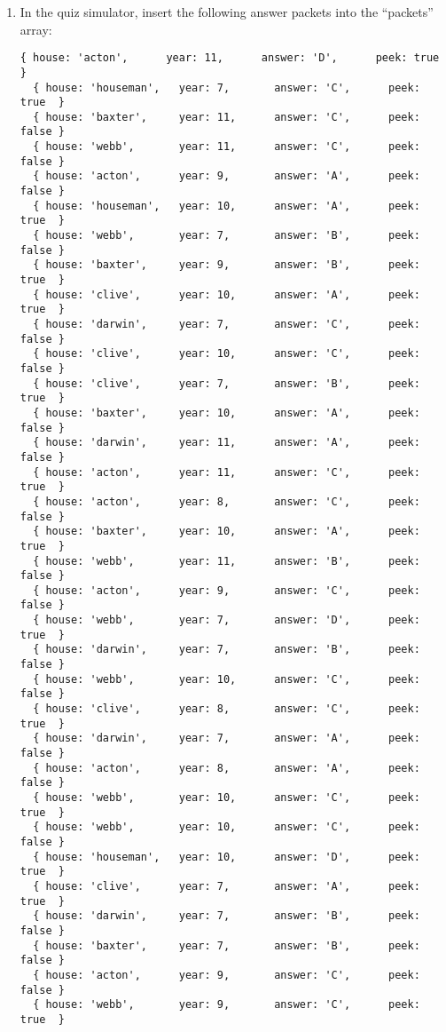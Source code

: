 \begin{enumerate}
  \item In the quiz simulator, insert the following answer packets into the ``packets'' array:
  \begin{Verbatim}[fontsize=\small]
  { house: 'acton',      year: 11,      answer: 'D',      peek: true  }
  { house: 'houseman',   year: 7,       answer: 'C',      peek: true  }
  { house: 'baxter',     year: 11,      answer: 'C',      peek: false }
  { house: 'webb',       year: 11,      answer: 'C',      peek: false }
  { house: 'acton',      year: 9,       answer: 'A',      peek: false }
  { house: 'houseman',   year: 10,      answer: 'A',      peek: true  }
  { house: 'webb',       year: 7,       answer: 'B',      peek: false }
  { house: 'baxter',     year: 9,       answer: 'B',      peek: true  }
  { house: 'clive',      year: 10,      answer: 'A',      peek: true  }
  { house: 'darwin',     year: 7,       answer: 'C',      peek: false }
  { house: 'clive',      year: 10,      answer: 'C',      peek: false }
  { house: 'clive',      year: 7,       answer: 'B',      peek: true  }
  { house: 'baxter',     year: 10,      answer: 'A',      peek: false }
  { house: 'darwin',     year: 11,      answer: 'A',      peek: false }
  { house: 'acton',      year: 11,      answer: 'C',      peek: true  }
  { house: 'acton',      year: 8,       answer: 'C',      peek: false }
  { house: 'baxter',     year: 10,      answer: 'A',      peek: true  }
  { house: 'webb',       year: 11,      answer: 'B',      peek: false }
  { house: 'acton',      year: 9,       answer: 'C',      peek: false }
  { house: 'webb',       year: 7,       answer: 'D',      peek: true  }
  { house: 'darwin',     year: 7,       answer: 'B',      peek: false }
  { house: 'webb',       year: 10,      answer: 'C',      peek: false }
  { house: 'clive',      year: 8,       answer: 'C',      peek: true  }
  { house: 'darwin',     year: 7,       answer: 'A',      peek: false }
  { house: 'acton',      year: 8,       answer: 'A',      peek: false }
  { house: 'webb',       year: 10,      answer: 'C',      peek: true  }
  { house: 'webb',       year: 10,      answer: 'C',      peek: false }
  { house: 'houseman',   year: 10,      answer: 'D',      peek: true  }
  { house: 'clive',      year: 7,       answer: 'A',      peek: true  }
  { house: 'darwin',     year: 7,       answer: 'B',      peek: false }
  { house: 'baxter',     year: 7,       answer: 'B',      peek: false }
  { house: 'acton',      year: 9,       answer: 'C',      peek: false }
  { house: 'webb',       year: 9,       answer: 'C',      peek: true  }

\end{Verbatim}
\end{enumerate}
